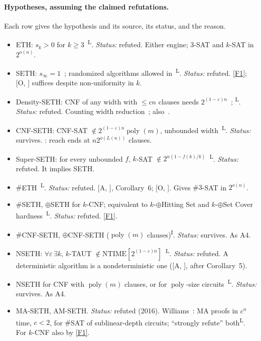 \documentclass[10pt]{amsart}
\theoremstyle{plain}
\theoremstyle{definition}
\theoremstyle{remark}
\numberwithin{equation}{section}
\newcommand{\poly}{\operatorname{poly}}
\newcommand{\A}[1][]{\textup{[A\if\relax\detokenize{#1}\relax\else, #1\fi]}}
\newcommand{\Oa}[1][]{\textup{[O\if\relax\detokenize{#1}\relax\else, #1\fi]}}
\newcommand{\Lit}{\textsuperscript{L}}
\newcommand{\Inf}{\textsuperscript{I}}
\begin{document}
\paragraph{Hypotheses, assuming the claimed refutations.}
Each row gives the hypothesis and its source, its status, and the reason.
{\small
\begin{itemize}[leftmargin=2.6em,itemsep=2pt]
\item[A1] ETH: $s_k>0$ for $k\ge3$~\cite{IP99,ImpagliazzoPaturi01}\Lit. \emph{Status:} refuted. Either engine; $3$-SAT and $k$-SAT in $2^{o(n)}$.
\item[A2] SETH: $s_\infty=1$~\cite{ImpagliazzoPaturi01}; randomized algorithms allowed in~\cite{CDLMNOPSW16}\Lit. \emph{Status:} refuted. \ref{F1}; \Oa{} suffices despite non-uniformity in $k$.
\item[A3] Density-SETH: CNF of any width with $\le cn$ clauses needs $2^{(1-\varepsilon)n}$~\cite{CIP06}; \cite[Conj.~2]{MT19a}\Lit. \emph{Status:} refuted. Counting width reduction~\cite[Cor.~6.2]{TulsyanQ26}; also~\cite[Prop.~6.1]{Li26}.
\item[A4] CNF-SETH: CNF-SAT $\notin2^{(1-\varepsilon)n}\poly(m)$, unbounded width~\cite{LMS11tw,BI18,Bri14,RVW13}\Lit. \emph{Status:} survives. : reach ends at $n2^{o(L(n))}$ clauses.
\item[A5] Super-SETH: for every unbounded $f$, $k$-SAT $\notin2^{n(1-f(k)/k)}$~\cite{VW21}\Lit. \emph{Status:} refuted. It implies SETH.
\item[A6] $\#$ETH~\cite[p.~21:5]{DHMTW14}\Lit. \emph{Status:} refuted. \A, Corollary~6; \Oa. Gives $\#3$-SAT in $2^{o(n)}$.
\item[A7] $\#$SETH, $\oplus$SETH for $k$-CNF; equivalent to $k$-$\oplus$Hitting Set and $k$-$\oplus$Set Cover hardness~\cite[Thm.~1.3]{CDLMNOPSW16}\Lit. \emph{Status:} refuted. \ref{F1}.
\item[A8] $\#$CNF-SETH, $\oplus$CNF-SETH ($\poly(m)$ clauses)\Inf. \emph{Status:} survives. As A4.
\item[A9] NSETH: $\forall\varepsilon\,\exists k$, $k$-TAUT $\notin\mathrm{NTIME}[2^{(1-\varepsilon)n}]$~\cite{CGIMPS16}\Lit. \emph{Status:} refuted. A deterministic algorithm is a nondeterministic one (\A, after Corollary~5).
\item[A10] NSETH for CNF with $\poly(m)$ clauses, or for $\poly$-size circuits~\cite[Conj.~3]{MT19a}\Lit. \emph{Status:} survives. As A4.
\item[A11] MA-SETH, AM-SETH. \emph{Status:} refuted (2016). Williams~\cite{Wil16MA}: MA proofs in $c^n$ time, $c<2$, for $\#$SAT of sublinear-depth circuits; ``strongly refute'' both\Lit. For $k$-CNF also by \ref{F1}.

\end{itemize}}
\end{document}
